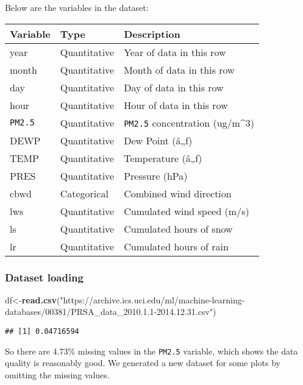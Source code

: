 \documentclass[]{article}
\newenvironment{Shaded}{\begin{snugshade}}{\end{snugshade}}
\newcommand{\FloatTok}[1]{\textcolor[rgb]{0.00,0.00,0.81}{#1}}
\newcommand{\KeywordTok}[1]{\textcolor[rgb]{0.13,0.29,0.53}{\textbf{#1}}}
\newcommand{\NormalTok}[1]{#1}
\newcommand{\OperatorTok}[1]{\textcolor[rgb]{0.81,0.36,0.00}{\textbf{#1}}}
\newcommand{\StringTok}[1]{\textcolor[rgb]{0.31,0.60,0.02}{#1}}
\begin{document}
Below are the variables in the dataset:

\begin{longtable}[]{@{}lll@{}}
\toprule
Variable & Type & Description\tabularnewline
\midrule
\endhead
year & Quantitative & Year of data in this row\tabularnewline
month & Quantitative & Month of data in this row\tabularnewline
day & Quantitative & Day of data in this row\tabularnewline
hour & Quantitative & Hour of data in this row\tabularnewline
\texttt{PM2.5} & Quantitative & \texttt{PM2.5} concentration
(ug/m\^{}3)\tabularnewline
DEWP & Quantitative & Dew Point (â„ƒ)\tabularnewline
TEMP & Quantitative & Temperature (â„ƒ)\tabularnewline
PRES & Quantitative & Pressure (hPa)\tabularnewline
cbwd & Categorical & Combined wind direction\tabularnewline
lws & Quantitative & Cumulated wind speed (m/s)\tabularnewline
ls & Quantitative & Cumulated hours of snow\tabularnewline
lr & Quantitative & Cumulated hours of rain\tabularnewline
\bottomrule
\end{longtable}

\hypertarget{dataset-loading}{%
\subsubsection{Dataset loading}\label{dataset-loading}}

\begin{Shaded}
\begin{Highlighting}[]
\NormalTok{df<-}\KeywordTok{read.csv}\NormalTok{(}\StringTok{"https://archive.ics.uci.edu/ml/machine-learning-databases/00381/PRSA_data_2010.1.1-2014.12.31.csv"}\NormalTok{)}
\end{Highlighting}
\end{Shaded}

\begin{Shaded}
\end{Shaded}

\begin{verbatim}
## [1] 0.04716594
\end{verbatim}

So there are 4.73\% missing values in the \texttt{PM2.5} variable, which
shows the data quality is reasonably good. We generated a new dataset
for some plots by omitting the missing values.
\end{document}
